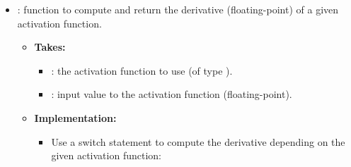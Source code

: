 \begin{itemize}
    given activation function.
  \begin{itemize}
    \item \textbf{Takes:}
    \begin{itemize}
      \item {}: the activation function to use (of type ).
      \item {}: input value to the activation function (floating-point).
    \end{itemize}
    \item \textbf{Implementation:}
    \begin{itemize}
      \item Use a switch statement to compute the output depending on the given activation
        function:
      \begin{itemize}
        \item {}: return  if , otherwise
          .
        \item {}: return  (requires
          ).
        \item Default case (): return  unchanged, which is the
          identity function.
      \end{itemize}
    \end{itemize}
    \item Should be marked \code{[[nodiscard]]} and .
  \end{itemize}
  \item {}: function to compute and return the derivative (floating-point) of a
    given activation function.
  \begin{itemize}
    \item \textbf{Takes:}
    \begin{itemize}
      \item {}: the activation function to use (of type ).
      \item {}: input value to the activation function (floating-point).
    \end{itemize}
    \item \textbf{Implementation:}
    \begin{itemize}
      \item Use a switch statement to compute the derivative depending on the given activation
        function:
      \begin{itemize}

\end{itemize}
\end{itemize}
\end{itemize}
\end{itemize}
